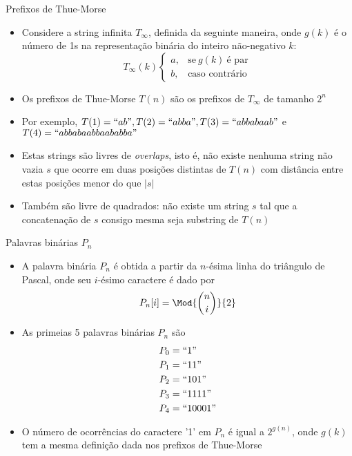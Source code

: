 \begin{frame}[fragile]{Prefixos de Thue-Morse}

    \begin{itemize}
        \item Considere a string infinita $T_\infty$, definida da seguinte maneira, onde $g(k)$ é 
            o número de 1s na representação binária do inteiro não-negativo $k$:
        \[
            T_\infty(k) \left\lbrace \begin{array}{ll} a, & \mbox{se}\ g(k)\ \mbox{é par} \\
            b,& \mbox{caso contrário} \end{array} \right.
        \]

        \item Os prefixos de Thue-Morse $T(n)$ são os prefixos de $T_\infty$ de tamanho $2^n$

        \item Por exemplo, $T(1) = ``ab", T(2) = ``abba", T(3) = ``abbabaab"$ e 
            $T(4) = ``abbabaabbaababba"$

        \item Estas strings são livres de \textit{overlaps}, isto é, não existe nenhuma string não 
            vazia $s$ que ocorre em duas posições distintas de $T(n)$ com distância entre estas 
            posições menor do que $|s|$

        \item Também são livre de quadrados: não existe um string $s$ tal que a concatenação de 
            $s$ consigo mesma seja substring de $T(n)$
    \end{itemize}

\end{frame}

\begin{frame}[fragile]{Palavras binárias $P_n$}

    \begin{itemize}
        \item A palavra binária $P_n$ é obtida a partir da $n$-ésima linha do triângulo de Pascal, 
            onde seu $i$-ésimo caractere é dado por 
            \[
                P_n[i] = \Mod{\binom{n}{i}}{2}
            \]

        \item As primeias 5 palavras binárias $P_n$ são
        \begin{align*}
            P_0 &= ``1" \\
            P_1 &= ``11" \\
            P_2 &= ``101" \\
            P_3 &= ``1111" \\
            P_4 &= ``10001"
        \end{align*}

        \item O número de ocorrências do caractere '1' em $P_n$ é igual a $2^{g(n)}$, onde 
            $g(k)$ tem a mesma definição dada nos prefixos de Thue-Morse
    \end{itemize}

\end{frame}

